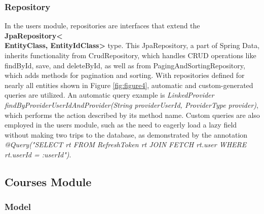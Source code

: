 \subsubsection{Repository}

\noindent In the users module, repositories are interfaces that extend the \textbf{JpaRepository<\\EntityClass, EntityIdClass>} type. This JpaRepository, a part of Spring Data, inherits functionality from CrudRepository, which handles CRUD operations like findById, save, and deleteById, as well as from PagingAndSortingRepository, which adds methods for pagination and sorting. With repositories defined for nearly all entities shown in Figure \ref{fig:figure4}, automatic and custom-generated queries are utilized. An automatic query example is \textit{LinkedProvider findByProviderUserIdAndProvider(String providerUserId, ProviderType provider)}, which performs the action described by its method name. Custom queries are also employed in the users module, such as the need to eagerly load a lazy field without making two trips to the database, as demonstrated by the annotation \textit{@Query("SELECT rt FROM RefreshToken rt JOIN FETCH rt.user WHERE rt.userId = :userId")}.

\subsection{Courses Module}

\subsubsection{Model}

